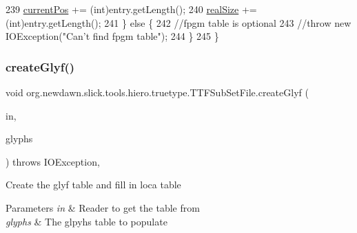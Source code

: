\begin{DoxyCode}
239             \mbox{\hyperlink{classorg_1_1newdawn_1_1slick_1_1tools_1_1hiero_1_1truetype_1_1_t_t_f_sub_set_file_a5027011db0d9c307afa8de09102eaa10}{currentPos}} += (int)entry.getLength();
240             \mbox{\hyperlink{classorg_1_1newdawn_1_1slick_1_1tools_1_1hiero_1_1truetype_1_1_t_t_f_sub_set_file_afbd6781b24988e94a488596aa954ee3c}{realSize}} += (int)entry.getLength();
241         \} \textcolor{keywordflow}{else} \{
242             \textcolor{comment}{//fpgm table is optional}
243             \textcolor{comment}{//throw new IOException("Can't find fpgm table");}
244         \}
245     \}
\end{DoxyCode}
\mbox{\label{classorg_1_1newdawn_1_1slick_1_1tools_1_1hiero_1_1truetype_1_1_t_t_f_sub_set_file_a2b576b795892e003c04787ffc1f7262a}} 
\subsubsection{\texorpdfstring{create\+Glyf()}{createGlyf()}}
{\footnotesize\ttfamily void org.\+newdawn.\+slick.\+tools.\+hiero.\+truetype.\+T\+T\+F\+Sub\+Set\+File.\+create\+Glyf (\begin{DoxyParamCaption}\item[{\mbox{\hyperlink{classorg_1_1newdawn_1_1slick_1_1tools_1_1hiero_1_1truetype_1_1_font_file_reader}{Font\+File\+Reader}}}]{in,  }\item[{Map}]{glyphs }\end{DoxyParamCaption}) throws I\+O\+Exception\hspace{0.3cm}{\ttfamily [inline]}, {\ttfamily [private]}}

Create the glyf table and fill in loca table


\begin{DoxyParams}{Parameters}
{\em in} & Reader to get the table from \\
\hline
{\em glyphs} & The glpyhs table to populate \\
\hline
\end{DoxyParams}

